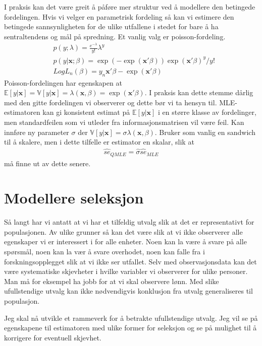 I praksis kan det være greit å påføre mer struktur ved å modellere den betingede fordelingen. Hvis vi velger en parametrisk fordeling så kan vi estimere den betingede sannsynligheten for de ulike utfallene i stedet for bare å ha sentraltendens og mål på spredning. Et vanlig valg er poisson-fordeling.
\begin{align}
&p(y;\lambda) = \frac{e^{-\lambda}}{y!}\lambda^y \\
&p(y|\mathbf{x};\beta) = \exp(-\exp(\mathbf{x}'\beta))\exp(\mathbf{x}'\beta)^y/y! \\
&LogL_n(\beta) = y_n\mathbf{x}'\beta-\exp(\mathbf{x}'\beta)
\end{align}
Poisson-fordelingen har egenskapen at $\mathbb{E}[y|\mathbf{x}] = \mathbb{V}[y|\mathbf{x}] = \lambda(\mathbf{x},\beta) = \exp(\mathbf{x}'\beta)$. I praksis kan dette stemme dårlig med den gitte fordelingen vi observerer og dette bør vi ta hensyn til. MLE-estimatoren kan gi konsistent estimat på $\mathbb{E}[y|\mathbf{x}]$ i en større klasse av fordelinger, men standardfeilen som vi utleder fra informasjonsmatrisen vil være feil. Kan innføre ny parameter $\sigma$ der $\mathbb{V}[y|\mathbf{x}] = \sigma \lambda(\mathbf{x},\beta)$. Bruker som vanlig en sandwich til å skalere, men i dette tilfelle er estimator en skalar, slik at
\begin{align}
\widehat{se}_{QMLE} = \hat{\sigma}\widehat{se}_{MLE}
\end{align}
må finne ut av dette senere.
\section{Modellere seleksjon}
Så langt har vi antatt at vi har et tilfeldig utvalg slik at det er representativt for populasjonen. Av ulike grunner så kan det være slik at vi ikke observerer alle egenskaper vi er interessert i for alle enheter. Noen kan la være å svare på alle spørsmål, noen kan la vær å svare overhodet, noen kan falle fra i forskningsopplegget slik at vi ikke ser utfallet. Selv med observasjonsdata kan det være systematiske skjevheter i hvilke variabler vi observerer for ulike personer. Man må for eksempel ha jobb for at vi skal observere lønn. Med slike ufullstendige utvalg kan ikke nødvendigvis konklusjon fra utvalg generaliseres til populasjon. 

Jeg skal nå utvikle et rammeverk for å betrakte ufullstendige utvalg. Jeg vil se på egenskapene til estimatoren med ulike former for seleksjon og se på mulighet til å korrigere for eventuell skjevhet.

